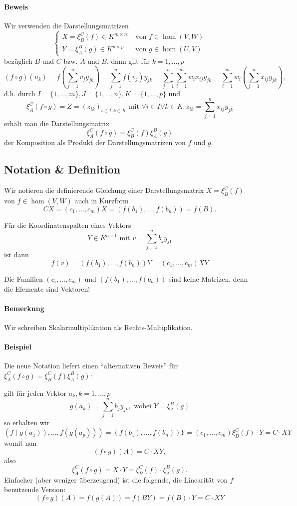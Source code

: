 \paragraph{Beweis}
	Wir verwenden die Darstellungsmatrizen
		\[ \begin{cases}
		X = \xi^C_B(f)\in K^{m\times n} &\text{ von } f\in \hom(V,W)\\
		Y = \xi_A^B(g)\in K^{n\times p} &\text{ von } g\in \hom(U,V)
		\end{cases} \]
	bezüglich $ B $ und $ C $ bzw. $ A $ und $ B $, dann gilt für $ k=1,\dots,p $
		\[ (f\circ g)(u_k)=f(\sum_{j=1}^{n}v_jy_{jk}) = \sum_{j=1}^{n}f(v_j)y_{jk} = \sum_{j=1}^{n}\sum_{i=1}^{m}w_ix_{ij}y_{jk} = \sum_{i=1}^{m}w_i\left(\sum_{j=1}^{n}x_{ij}y_{jk}\right), \]
	d.h. durch $ I=\{1,\dots,m\},J=\{1,\dots,n\},K=\{1,\dots,p\} $ und 
		\[ \xi_A^C(f\circ g) = Z = (z_{ik})_{i\in I,k\in K} \text{ mit }\forall i\in I\forall k\in K: z_{ik}= \sum_{j=1}^{n}x_{ij}y_{jk} \]
	erhält man die Darstellungsmatrix
		\[ \xi_A^C(f\circ g) = \xi_B^C(f)\xi_A^B(g) \]
	der Komposition als Produkt der Darstellungsmatrizen von $ f $ und $ g $.
\subsection{Notation \& Definition}
	Wir notieren die definierende Gleichung einer Darstellungsmatrix $ X=\xi_B^C(f) $ von $ f\in \hom(V,W) $ auch in Kurzform
		\[ CX=(c_1,\dots,c_m)X = (f(b_1),\dots,f(b_n)) = f(B). \]
	\begin{Definition}[Koordinatenspalte]
	Für die Koordinatenspalten eines Vektors
		\[ Y\in K^{n\times 1} \text{ mit } v=\sum_{j=1}^{n}b_jy_{j1} \]
	ist dann
		\[ f(v) = (f(b_1),\dots,f(b_n))Y = (c_1,\dots,c_m)XY \]
	\end{Definition}
	Die Familien $ (c_i,\dots,c_m) $ und $ (f(b_1),\dots,f(b_n)) $ sind keine Matrizen, denn die Elemente sind Vektoren!
\paragraph{Bemerkung}
	Wir schreiben Skalarmultiplikation als Rechts-Multiplikation.
\paragraph{Beispiel}
	Die neue Notation liefert einen "`alternativen Beweis"' für $ \xi_A^C(f\circ g) = \xi_B^C(f)\xi_A^B(g) $:
	
	gilt für jeden Vektor $ a_k,k=1,\dots,p $
		\[ g(a_k) = \sum_{j=1}^{n}b_jy_{jk}, \text{ wobei } Y = \xi_A^B(g) \]
	so erhalten wir
		\[ (f(g(a_1)),\dots, f(g(a_p))) = (f(b_1),\dots , f(b_n))Y = (c_1,\dots,c_m)\xi_B^C(f)\cdot Y = C\cdot XY \]
	womit nun
		\[ (f\circ g)(A) = C\cdot XY, \]
	also
		\[ \xi_A^C(f\circ g) = X\cdot Y = \xi_B^C(f)\cdot \xi_A^B(g). \]
	Einfacher (aber weniger überzeugend) ist die folgende, die Linearität von $ f $ benutzende Version:
		\[( f\circ g )(A) = f(g(A)) = f(BY) = f(B)\cdot Y = C\cdot XY\]

